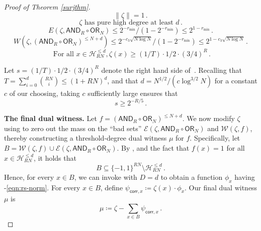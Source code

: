 \documentclass{toc}
\newcommand{\OR}{\mathsf{ OR}}
\newcommand{\bits}{\{-1,1\}}
\newcommand{\AND}{\mathsf{AND}}
\begin{document}
\begin{proof}[Proof of Theorem \ref{surjthm}]
	\begin{equation}
	\label{zetaprop1} \|\zeta\|=1\,.
	\end{equation}
	\begin{equation}
	\label{zetaprop2}
	\zeta \text{ has pure high degree at least } d\,.
	\end{equation}
	\begin{equation}
	\label{zetapropr3}
	E\left(\zeta, \AND_R \circ \OR_N\right) \leq 2^{-r_{\text{min}}}/\left(1-2^{-r_{\text{min}}}\right) \leq  2^{1-r_{\text{min}}}\,.
	\end{equation}
	\begin{equation}
	\label{zetaprop4}
	W\left(\zeta, \left(\AND_R \circ \OR_N\right)^{\leq N+d}\right) \leq 2^{-c_3 \sqrt{N \log N}}/(1-2^{-r_{\text{min}}}) \leq 2^{1-c_3 \sqrt{N \log N}}\,.
	\end{equation}
	\begin{equation}
	\label{zetaprop5}
	\text{ For all } x \in \mathcal{H}^{\leq d}_{RN}, \zeta(x) \geq (1/T) \cdot 1/2 \cdot (3/4)^{R}\,.
	\end{equation}
	
	Let $s = (1/T) \cdot 1/2 \cdot (3/4)^R$ denote the right hand side of \,. 
Recalling that $T=\sum_{i=0}^{d} {RN \choose i} \leq (1+RN)^d$, and that $d=N^{1/2}/(c \log^{3/2} N)$ for a constant $c$ of our choosing, 
	taking $c$ sufficiently large ensures that 
	\begin{equation} \label{zeq} s \geq 2^{-R/5}\,. \end{equation}
	
	
	
	\medskip
	\noindent \textbf{The final dual witness.} Let $f=\left(\AND_R \circ \OR_N\right)^{\leq N+d}$. We now modify $\zeta$ using  to zero out the mass on the ``bad sets'' $\mathcal{E}(\zeta, \AND_R \circ \OR_N)$ and $\mathcal{W}(\zeta, f)$,
	thereby constructing a %
	threshold-degree %
	 dual witness $\mu$ for $f$. 
	Specifically, let $B=\mathcal{W}(\zeta, f) \cup \mathcal{E}(\zeta, \AND_R \circ \OR_N)$.
	By ,
	and the fact that $f(x) =1$ for all $x \in \mathcal{H}_{RN}^{\leq d}$,
	it holds that 
	\begin{equation}
	\label{subseteq} B \subseteq \bits^{RN}\setminus \mathcal{H}_{RN}^{\leq d}\,.
	\end{equation}
	Hence, for every $x \in B$, we can invoke  with $D=d$ to
	obtain a function $\phi_x$ having  %
	-\eqref{eqn:rs-norm}.
	For every $x \in B$, 
	define $\psi_{\mathsf{corr}, x} \coloneqq  \zeta(x) \cdot \phi_x$. %
	Our final dual witness $\mu$ is 
	\begin{equation} \mu \coloneqq  \zeta - \sum_{x \in B} \psi_{\mathsf{corr}, x}\,. \label{omg1}\end{equation}
	

\end{proof}
\end{document}
